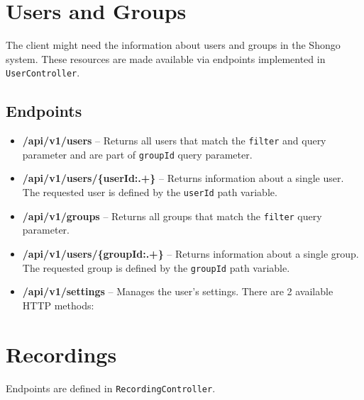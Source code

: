 \section{Users and Groups}
The client might need the information about users and groups in the Shongo system.
These resources are made available via endpoints implemented in \texttt{UserController}.

\subsection{Endpoints}
\begin{itemize}
    \item \textbf{/api/v1/users} -- Returns all users that match the \texttt{filter} and query parameter and are part of \texttt{groupId} query parameter.
    \item \textbf{/api/v1/users/\{userId:.+\}} -- Returns information about a single user. The requested user is defined by the \texttt{userId} path variable.
    \item \textbf{/api/v1/groups} -- Returns all groups that match the \texttt{filter} query parameter.
    \item \textbf{/api/v1/users/\{groupId:.+\}} -- Returns information about a single group. The requested group is defined by the \texttt{groupId} path variable.
    \item \textbf{/api/v1/settings} -- Manages the user's settings. There are 2 available HTTP methods:
\end{itemize}


\section{Recordings}
Endpoints are defined in \texttt{RecordingController}.
